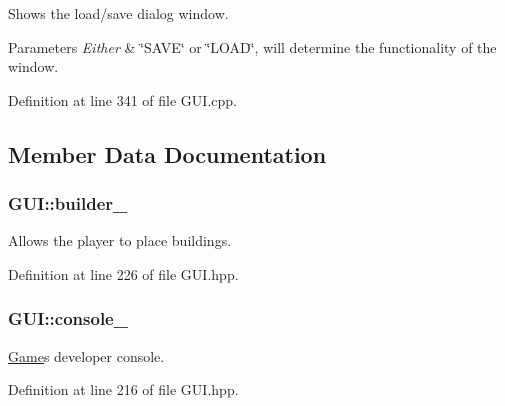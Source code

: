 Shows the load/save dialog window. 


\begin{DoxyParams}{Parameters}
{\em Either} & \char`\"{}\+S\+A\+V\+E\char`\"{} or \char`\"{}\+L\+O\+A\+D\char`\"{}, will determine the functionality of the window. \\
\hline
\end{DoxyParams}


Definition at line 341 of file G\+U\+I.\+cpp.



\subsection{Member Data Documentation}
\subsubsection[{\texorpdfstring{builder\+\_\+}{builder_}}]{ G\+U\+I\+::builder\+\_\+\hspace{0.3cm}{\ttfamily [private]}}\hypertarget{class_g_u_i_a0384e5c8eeb11e4181ca31e621a897cb}{}\label{class_g_u_i_a0384e5c8eeb11e4181ca31e621a897cb}


Allows the player to place buildings. 



Definition at line 226 of file G\+U\+I.\+hpp.

\subsubsection[{\texorpdfstring{console\+\_\+}{console_}}]{ G\+U\+I\+::console\+\_\+\hspace{0.3cm}{\ttfamily [private]}}\hypertarget{class_g_u_i_aa16bd75eb28be973d2df6480cc65c68b}{}\label{class_g_u_i_aa16bd75eb28be973d2df6480cc65c68b}


\hyperlink{class_game}{Game}\textquotesingle{}s developer console. 



Definition at line 216 of file G\+U\+I.\+hpp.

